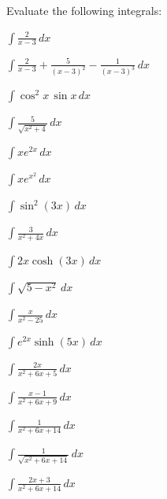 \documentclass[12pt]{exam}
\begin{document}
Evaluate the following integrals:
\begin{questions}
\question  $\displaystyle \int \frac{2}{x-3}    \, dx$
\vspace{.35in}

\question $\displaystyle \int \frac{2}{x-3} + \frac {5}{(x-3)^2} 
- \frac{1}{(x-3)^3}    \, dx$
\vspace{.35in}

\question $\displaystyle \int  \cos^2 x \, \sin x \, dx$
\vspace{.35in}

\question $\displaystyle \int \frac{5}{\sqrt{x^2 +4}} \, dx$
\vspace{.35in}

\question $\int x e^{2x} \, dx$
\vspace{.35in}

\question $\int x e^{x^2} \, dx$
\vspace{.35in}


\question $\int \sin^2(3x)\, dx$
\vspace{.35in}

\question $\displaystyle \int  \frac{3}{x^2+4x} \, dx$
\vspace{.35in}

\question $\displaystyle \int  2x\cosh(3x) \, dx$
\vspace{.35in}

\question $\displaystyle \int   \sqrt{5-x^2} \, dx$
\vspace{.35in}

\question $\displaystyle \int \frac{x}{x^2-25}\, dx$
\vspace{.35in}

\question $\displaystyle \int e^{2x} \sinh(5x)\, dx$
\vspace{.35in}

\question $\displaystyle \int   \frac{2x}{x^2+6x+5} \, dx$
\vspace{.35in}

\question $\displaystyle \int  \frac{x-1}{x^2+6x+9} \, dx$
\vspace{.35in}

\question $\displaystyle \int  \frac{1}{x^2+6x +14} \, dx$
\vspace{.35in}

\question $\displaystyle \int \frac{1}{\sqrt{x^2+6x+14}}  \, dx$
\vspace{.35in}

\question $\displaystyle \int \frac {2x+3}{x^2+6x +14}   \, dx$
\vspace{.35in}


\end{questions}
\end{document}
